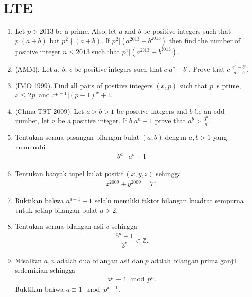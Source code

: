 \documentclass[11pt]{scrartcl}
\begin{document}
\section{LTE}
\begin{enumerate}[resume]
    \item Let $p > 2013$ be a prime. Also, let $a$ and $b$ be positive integers such that $p|(a + b)$ but $p^2 \nmid  (a + b)$. If $p^2|(a^{2013} + b^{2013})$ then find the number of positive integer $n \leq 2013$ such that $p^n|(a^{2013} + b^{2013})$.
    
    \item (AMM). Let $a$, $b$, $c$ be positive integers such that $c | a^c-b^c$. Prove that $c | \frac{a^c-b^c}{a-b}$.
    
    \item (IMO 1999). Find all pairs of positive integers $(x, p)$ such that $p$ is prime, $x \leq 2p$, and $x^{p-1} | (p - 1)^x + 1$.
    
    \item (China TST 2009). Let $a > b > 1$ be positive integers and $b$ be an odd number, let $n$ be a positive integer. If $b|a^n-1$ prove that $a^b > \frac{3^n}{n}$.
    
    \item Tentukan semua pasangan bilangan bulat $(a,b)$ dengan $a,b > 1$ yang memenuhi 
    \begin{align*}
        b^a \mid a^b -1
    \end{align*}
    
    \item Tentukan banyak tupel bulat positif $(x,y,z)$ sehingga
    \begin{align*}
        x^{2009}+y^{2009} = 7^z.
    \end{align*}
    
    \item Buktikan bahwa $a^{a-1}-1$ selalu memiliki faktor bilangan kuadrat sempurna untuk setiap bilangan bulat $a > 2$.
    
    \item Tentukan semua bilangan asli $a$ sehingga
    \begin{align*}
        \dfrac{5^a+1}{3^a} \in \mathbb{Z}.
    \end{align*}
    
    \item Misalkan $a,n$ adalah dua bilangan asli dan $p$ adalah bilangan prima ganjil sedemikian sehingga
    \begin{align*}
        a^p \equiv 1 \mod p^n.
    \end{align*}
    Buktikan bahwa $a \equiv 1 \mod p^{n-1}.$


\end{enumerate}
\end{document}
